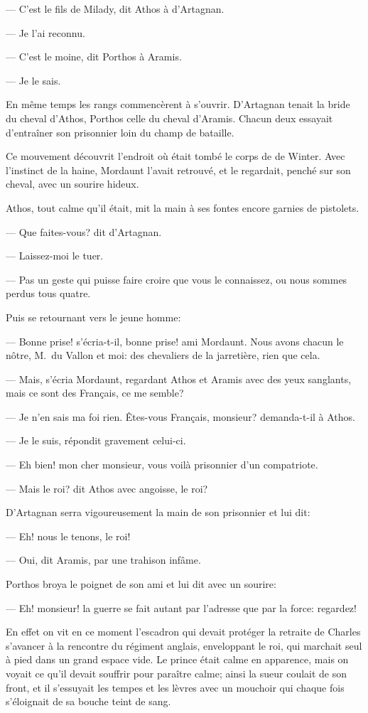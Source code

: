 — C'est le fils de Milady, dit Athos à d'Artagnan.

— Je l'ai reconnu.

— C'est le moine, dit Porthos à Aramis.

— Je le sais.

En même temps les rangs commencèrent à s'ouvrir. D'Artagnan tenait la bride du cheval d'Athos, Porthos celle du cheval d'Aramis. Chacun deux essayait d'entraîner son prisonnier loin du champ de bataille.

Ce mouvement découvrit l'endroit où était tombé le corps de de Winter. Avec l'instinct de la haine, Mordaunt l'avait retrouvé, et le regardait, penché sur son cheval, avec un sourire hideux.

Athos, tout calme qu'il était, mit la main à ses fontes encore garnies de pistolets.

— Que faites-vous? dit d'Artagnan.

— Laissez-moi le tuer.

— Pas un geste qui puisse faire croire que vous le connaissez, ou nous sommes perdus tous quatre.

Puis se retournant vers le jeune homme:

— Bonne prise! s'écria-t-il, bonne prise! ami Mordaunt. Nous avons chacun le nôtre, M.~du Vallon et moi: des chevaliers de la jarretière, rien que cela.

— Mais, s'écria Mordaunt, regardant Athos et Aramis avec des yeux sanglants, mais ce sont des Français, ce me semble?

— Je n'en sais ma foi rien. Êtes-vous Français, monsieur? demanda-t-il à Athos.

— Je le suis, répondit gravement celui-ci.

— Eh bien! mon cher monsieur, vous voilà prisonnier d'un compatriote.

— Mais le roi? dit Athos avec angoisse, le roi?

D'Artagnan serra vigoureusement la main de son prisonnier et lui dit:

— Eh! nous le tenons, le roi!

— Oui, dit Aramis, par une trahison infâme.

Porthos broya le poignet de son ami et lui dit avec un sourire:

— Eh! monsieur! la guerre se fait autant par l'adresse que par la force: regardez!

En effet on vit en ce moment l'escadron qui devait protéger la retraite de Charles s'avancer à la rencontre du régiment anglais, enveloppant le roi, qui marchait seul à pied dans un grand espace vide. Le prince était calme en apparence, mais on voyait ce qu'il devait souffrir pour paraître calme; ainsi la sueur coulait de son front, et il s'essuyait les tempes et les lèvres avec un mouchoir qui chaque fois s'éloignait de sa bouche teint de sang.

